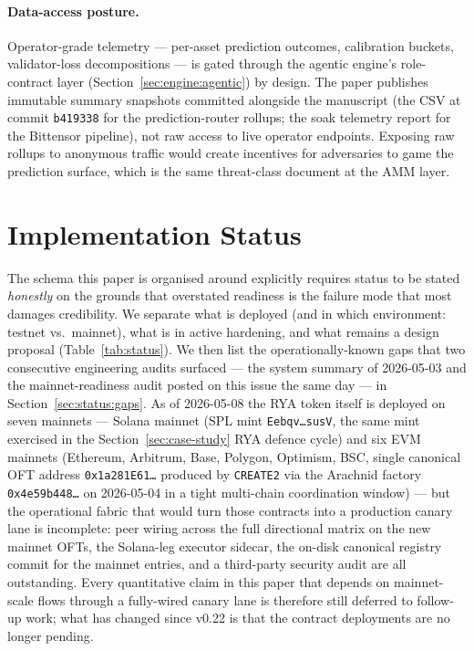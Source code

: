 \documentclass[11pt,a4paper]{article}
\begin{document}
\paragraph{Data-access posture.} Operator-grade telemetry --- per-asset
prediction outcomes, calibration buckets, validator-loss decompositions --- is
gated through the agentic engine's role-contract layer
(Section~\ref{sec:engine:agentic}) by design. The paper publishes immutable
summary snapshots committed alongside the manuscript (the CSV at commit
\texttt{b419338} for the prediction-router rollups; the soak telemetry report
for the Bittensor pipeline), not raw access to live operator endpoints.
Exposing raw rollups to anonymous traffic would create incentives for
adversaries to game the prediction surface, which is the same threat-class
\cite{cong2022crypto} document at the AMM layer.

\section{Implementation Status}\label{sec:status}

The schema this paper is organised around explicitly requires status to be stated
\emph{honestly} on the grounds that overstated readiness is the failure mode that
most damages credibility. We separate what is deployed (and in which environment:
testnet vs.\ mainnet), what is in active hardening, and what remains a design
proposal (Table~\ref{tab:status}). We then list the operationally-known gaps
that two consecutive engineering audits surfaced --- the system summary
of 2026-05-03 and the mainnet-readiness audit posted on this issue the same
day --- in Section~\ref{sec:status:gaps}. As of 2026-05-08 the RYA token
itself is deployed on seven mainnets --- Solana mainnet (SPL mint
\texttt{Eebqv\dots susV}, the same mint exercised in the
Section~\ref{sec:case-study} RYA defence cycle) and six EVM mainnets
(Ethereum, Arbitrum, Base, Polygon, Optimism, BSC, single canonical OFT
address \texttt{0x1a281E61\dots} produced by \texttt{CREATE2} via the
Arachnid factory \texttt{0x4e59b448\dots} on 2026-05-04 in a tight
multi-chain coordination window) --- but the operational fabric that would
turn those contracts into a production canary lane is incomplete: peer
wiring across the full directional matrix on the new mainnet OFTs, the
Solana-leg executor sidecar, the on-disk canonical registry commit for the
mainnet entries, and a third-party security audit are all outstanding.
Every quantitative claim in this paper that depends on mainnet-scale flows
through a fully-wired canary lane is therefore still deferred to follow-up
work; what has changed since v0.22 is that the contract deployments are no
longer pending.
\end{document}
